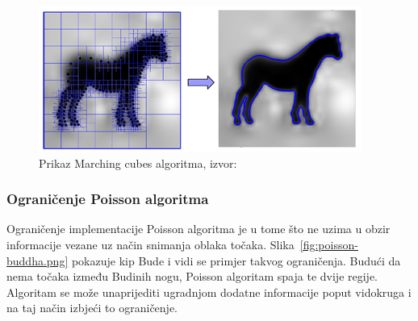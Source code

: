 \begin{figure}[h]
\centering
\includegraphics[scale=0.8]{figures/poisson-marching-cubes.png}
\caption[]{Prikaz Marching cubes algoritma, izvor:~\cite{Kazhdan:2007}}
\label{fig:poisson-marching-cubes.png}
\end{figure}


\subsubsection{Ograničenje Poisson algoritma} %
\label{ssub:Ograničenje Poisson algoritma}

Ograničenje implementacije Poisson algoritma je u tome što ne uzima u
obzir informacije vezane uz način snimanja oblaka točaka.
Slika~\ref{fig:poisson-buddha.png} pokazuje kip Bude i vidi se primjer takvog
ograničenja. Budući da nema točaka između Budinih nogu, Poisson
algoritam spaja te dvije regije. Algoritam se može unaprijediti
ugradnjom dodatne informacije poput vidokruga i na taj način izbjeći to
ograničenje.


